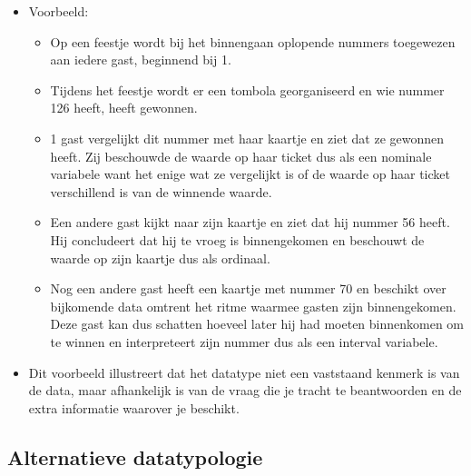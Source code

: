 \documentclass[]{tufte-book}
\providecommand{\tightlist}{%
  \setlength{\itemsep}{0pt}\setlength{\parskip}{0pt}}
\begin{document}
\begin{itemize}
\tightlist
\item
  Voorbeeld:

  \begin{itemize}
  \tightlist
  \item
    Op een feestje wordt bij het binnengaan oplopende nummers toegewezen aan iedere gast, beginnend bij 1.
  \item
    Tijdens het feestje wordt er een tombola georganiseerd en wie nummer 126 heeft, heeft gewonnen.
  \item
    1 gast vergelijkt dit nummer met haar kaartje en ziet dat ze gewonnen heeft. Zij beschouwde de waarde op haar ticket dus als een nominale variabele want het enige wat ze vergelijkt is of de waarde op haar ticket verschillend is van de winnende waarde.
  \item
    Een andere gast kijkt naar zijn kaartje en ziet dat hij nummer 56 heeft. Hij concludeert dat hij te vroeg is binnengekomen en beschouwt de waarde op zijn kaartje dus als ordinaal.
  \item
    Nog een andere gast heeft een kaartje met nummer 70 en beschikt over bijkomende data omtrent het ritme waarmee gasten zijn binnengekomen. Deze gast kan dus schatten hoeveel later hij had moeten binnenkomen om te winnen en interpreteert zijn nummer dus als een interval variabele.
  \end{itemize}
\item
  Dit voorbeeld illustreert dat het datatype niet een vaststaand kenmerk is van de data, maar afhankelijk is van de vraag die je tracht te beantwoorden en de extra informatie waarover je beschikt.
\end{itemize}

\hypertarget{alternatieve-datatypologie}{%
\subsection{Alternatieve datatypologie}\label{alternatieve-datatypologie}}
\end{document}
